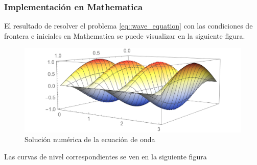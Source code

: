 \documentclass[a4paper]{article}
\begin{document}
\subsubsection{Implementación en Mathematica}
El resultado de resolver el problema \ref{eq::wave_equation} con las condiciones de frontera e iniciales en Mathematica se puede visualizar en la siguiente figura.
\begin{figure}[H]
\begin{center}
\includegraphics[scale=0.42]{./wave.png} 
\end{center} 
\caption{Solución numérica de la ecuación de onda}
\label{fig::fig7}
\end{figure}
Las curvas de nivel correspondientes se ven en la siguiente figura
\end{document}
